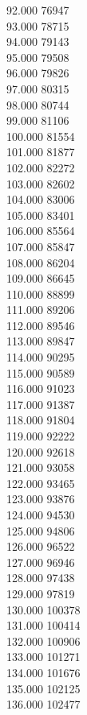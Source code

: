 { 92.000	76947 \\
 93.000	78715 \\
 94.000	79143 \\
 95.000	79508 \\
 96.000	79826 \\
 97.000	80315 \\
 98.000	80744 \\
 99.000	81106 \\
 100.000	81554 \\
 101.000	81877 \\
 102.000	82272 \\
 103.000	82602 \\
 104.000	83006 \\
 105.000	83401 \\
 106.000	85564 \\
 107.000	85847 \\
 108.000	86204 \\
 109.000	86645 \\
 110.000	88899 \\
 111.000	89206 \\
 112.000	89546 \\
 113.000	89847 \\
 114.000	90295 \\
 115.000	90589 \\
 116.000	91023 \\
 117.000	91387 \\
 118.000	91804 \\
 119.000	92222 \\
 120.000	92618 \\
 121.000	93058 \\
 122.000	93465 \\
 123.000	93876 \\
 124.000	94530 \\
 125.000	94806 \\
 126.000	96522 \\
 127.000	96946 \\
 128.000	97438 \\
 129.000	97819 \\
 130.000	100378 \\
 131.000	100414 \\
 132.000	100906 \\
 133.000	101271 \\
 134.000	101676 \\
 135.000	102125 \\
 136.000	102477 \\
}
